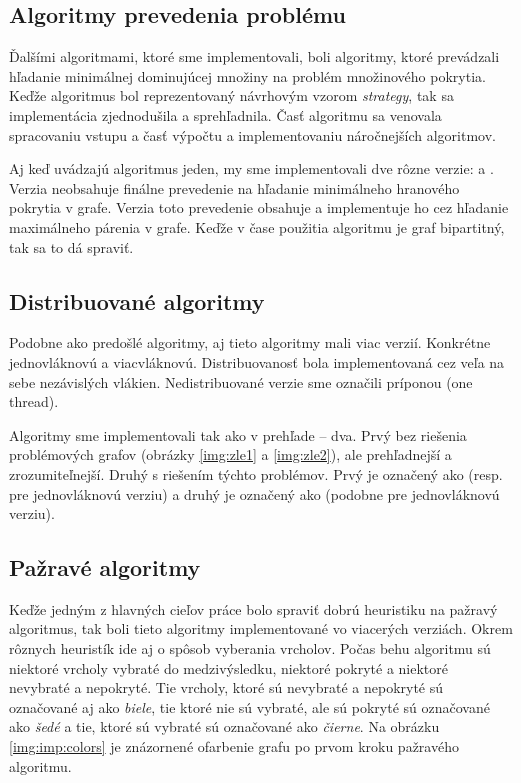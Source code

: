 \subsection{Algoritmy prevedenia problému}

Ďalšími algoritmami, ktoré sme implementovali, boli algoritmy, ktoré prevádzali 
hľadanie minimálnej dominujúcej množiny na problém množinového pokrytia. Keďže 
algoritmus bol reprezentovaný návrhovým vzorom \emph{strategy}, tak 
sa implementácia zjednodušila a sprehľadnila. Časť algoritmu sa venovala 
spracovaniu vstupu a časť výpočtu a implementovaniu náročnejších algoritmov. 

Aj keď \citet{fomin05} uvádzajú algoritmus jeden, my sme implementovali dve rôzne 
verzie:  a . Verzia  neobsahuje finálne 
prevedenie na hľadanie minimálneho hranového pokrytia v grafe. Verzia 
 toto prevedenie obsahuje a implementuje ho cez hľadanie 
maximálneho párenia v grafe. Keďže v čase použitia algoritmu je graf 
bipartitný, tak sa to dá spraviť.

\subsection{Distribuované algoritmy}

Podobne ako predošlé algoritmy, aj tieto algoritmy mali viac verzií. Konkrétne 
jednovláknovú a viacvláknovú. Distribuovanosť bola implementovaná cez veľa 
na sebe nezávislých vlákien. Nedistribuované verzie sme označili príponou 
 (one thread).

Algoritmy sme implementovali tak ako v prehľade -- dva. Prvý bez riešenia 
problémových grafov (obrázky \ref{img:zle1} a \ref{img:zle2}), ale prehľadnejší 
a zrozumiteľnejší. Druhý s riešením týchto problémov. Prvý je označený ako 
 (resp.~ pre jednovláknovú verziu) a druhý je 
označený ako  (podobne  pre jednovláknovú verziu).

\subsection{Pažravé algoritmy}

Keďže jedným z hlavných cieľov práce bolo spraviť dobrú heuristiku na pažravý 
algoritmus, tak boli tieto algoritmy implementované vo viacerých verziách. Okrem 
rôznych heuristík ide aj o spôsob vyberania vrcholov. Počas behu algoritmu sú 
niektoré vrcholy vybraté do medzivýsledku, niektoré pokryté a niektoré 
nevybraté a nepokryté. Tie vrcholy, ktoré sú nevybraté a nepokryté sú 
označované aj ako \emph{biele}, tie ktoré nie sú vybraté, ale sú pokryté sú 
označované ako \emph{šedé} a tie, ktoré sú vybraté sú označované ako 
\emph{čierne}. Na obrázku \ref{img:imp:colors} je znázornené ofarbenie grafu 
po prvom kroku pažravého algoritmu.

